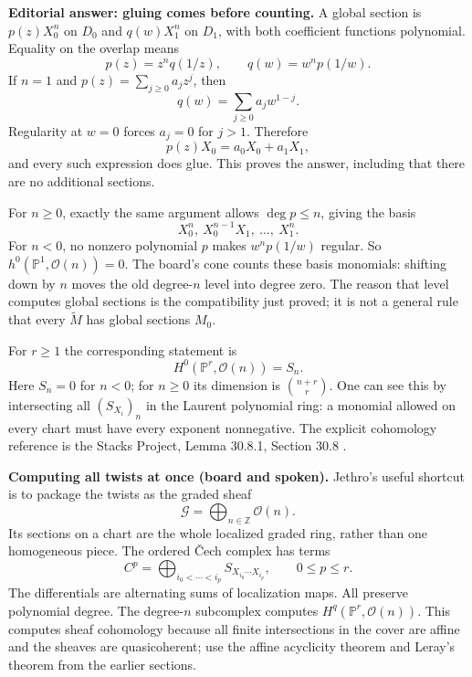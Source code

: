 \noindent
\textbf{Editorial answer: gluing comes
before counting.} A global section is
$p(z)X_0^n$ on $D_0$ and $q(w)X_1^n$ on
$D_1$, with both coefficient functions
polynomial. Equality on the overlap means
$$
p(z)=z^nq(1/z),\qquad
q(w)=w^np(1/w).
$$
If $n=1$ and $p(z)=\sum_{j\geq0}a_jz^j$,
then
$$
q(w)=\sum_{j\geq0}a_jw^{1-j}.
$$
Regularity at $w=0$ forces $a_j=0$ for
$j>1$. Therefore
$$
p(z)X_0=a_0X_0+a_1X_1,
$$
and every such expression does glue. This
proves the answer, including that there
are no additional sections.

For $n\geq0$, exactly the same argument
allows $\deg p\leq n$, giving the basis
$$
X_0^n,\ X_0^{n-1}X_1,\ \ldots,\ X_1^n.
$$
For $n<0$, no nonzero polynomial $p$ makes
$w^np(1/w)$ regular. So
$h^0(\mathbb{P}^1,\mathcal{O}(n))=0$.
The board's cone counts these basis
monomials: shifting down by $n$ moves the
old degree-$n$ level into degree zero.
The reason that level computes global
sections is the compatibility just proved;
it is not a general rule that every
$\widetilde M$ has global sections $M_0$.

For $r\geq1$ the corresponding statement
is
$$
H^0(\mathbb{P}^r,\mathcal{O}(n))=S_n.
$$
Here $S_n=0$ for $n<0$; for $n\geq0$ its
dimension is $\binom{n+r}{r}$. One can see
this by intersecting all $(S_{X_i})_n$ in
the Laurent polynomial ring: a monomial
allowed on every chart must have every
exponent nonnegative. The explicit
cohomology reference is the Stacks
Project, Lemma 30.8.1, Section 30.8
\cite{stacks-project}.

\medskip\noindent
{\bf Computing all twists at once (board
and spoken).} Jethro's useful shortcut is
to package the twists as the graded sheaf
$$
\mathcal{G}=\bigoplus_{n\in\mathbb{Z}}
\mathcal{O}(n).
$$
Its sections on a chart are the whole
localized graded ring, rather than one
homogeneous piece. The ordered \v{C}ech
complex has terms
$$
C^p=\bigoplus_{i_0<\cdots<i_p}
S_{X_{i_0}\cdots X_{i_p}},
\qquad 0\leq p\leq r.
$$
The differentials are alternating sums of
localization maps. All preserve polynomial
degree. The degree-$n$ subcomplex computes
$H^q(\mathbb{P}^r,\mathcal{O}(n))$.
This computes sheaf cohomology because all
finite intersections in the cover are
affine and the sheaves are quasicoherent;
use the affine acyclicity theorem and
Leray's theorem from the earlier sections.

